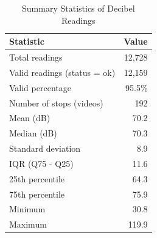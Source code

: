\begin{table}[htbp]
\centering
\caption{Summary Statistics of Decibel Readings}
\label{tab:summary}
\begin{tabular}{lr}
\toprule
Statistic & Value \\
\midrule
Total readings & 12,728 \\
Valid readings (status = ok) & 12,159 \\
Valid percentage & 95.5\% \\
Number of stops (videos) & 192 \\
\midrule
Mean (dB) & 70.2 \\
Median (dB) & 70.3 \\
Standard deviation & 8.9 \\
IQR (Q75 - Q25) & 11.6 \\
25th percentile & 64.3 \\
75th percentile & 75.9 \\
Minimum & 30.8 \\
Maximum & 119.9 \\
\bottomrule
\end{tabular}
\end{table}
